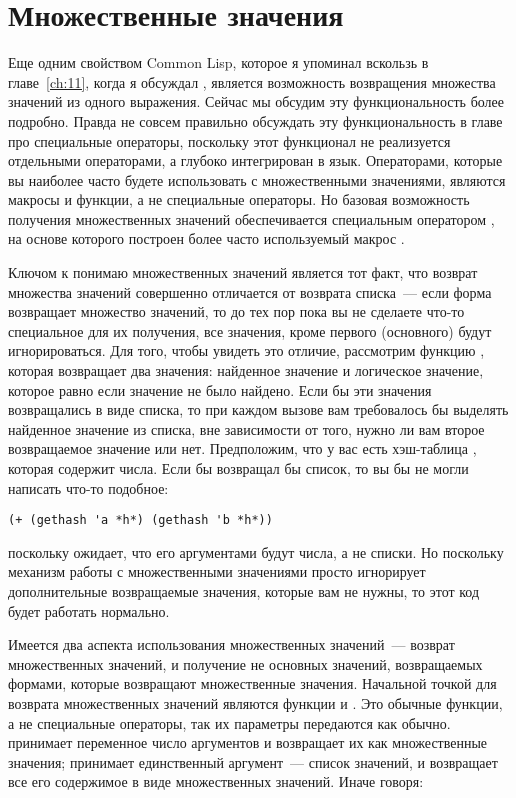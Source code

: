 \section{Множественные значения}

Еще одним свойством Common Lisp, которое я упоминал вскользь в главе~\ref{ch:11}, когда я
обсуждал , является возможность возвращения множества значений из одного
выражения. Сейчас мы обсудим эту функциональность более подробно. Правда не совсем
правильно обсуждать эту функциональность в главе про специальные операторы, поскольку этот
функционал не реализуется отдельными операторами, а глубоко интегрирован в
язык. Операторами, которые вы наиболее часто будете использовать с множественными
значениями, являются макросы и функции, а не специальные операторы.  Но базовая
возможность получения множественных значений обеспечивается специальным оператором
, на основе которого построен более часто используемый макрос
.

Ключом к понимаю множественных значений является тот факт, что возврат множества значений
совершенно отличается от возврата списка~--- если форма возвращает множество значений, то
до тех пор пока вы не сделаете что-то специальное для их получения, все значения, кроме
первого (основного) будут игнорироваться.  Для того, чтобы увидеть это отличие, рассмотрим
функцию , которая возвращает два значения: найденное значение и логическое
значение, которое равно  если значение не было найдено.  Если бы эти значения
возвращались в виде списка, то при каждом вызове  вам требовалось бы
выделять найденное значение из списка, вне зависимости от того, нужно ли вам второе
возвращаемое значение или нет.  Предположим, что у вас есть хэш-таблица ,
которая содержит числа.  Если бы  возвращал бы список, то вы бы не могли
написать что-то подобное:

\begin{lstlisting}
(+ (gethash 'a *h*) (gethash 'b *h*))
\end{lstlisting}

поскольку \code{+} ожидает, что его аргументами будут числа, а не списки. Но поскольку
механизм работы с множественными значениями просто игнорирует дополнительные возвращаемые
значения, которые вам не нужны, то этот код будет работать нормально.

Имеется два аспекта использования множественных значений~--- возврат множественных
значений, и получение не основных значений, возвращаемых формами, которые возвращают
множественные значения.  Начальной точкой для возврата множественных значений являются
функции  и .  Это обычные функции, а не специальные
операторы, так их параметры передаются как обычно.   принимает переменное
число аргументов и возвращает их как множественные значения;  принимает
единственный аргумент~--- список значений, и возвращает все его содержимое в виде
множественных значений.  Иначе говоря:

